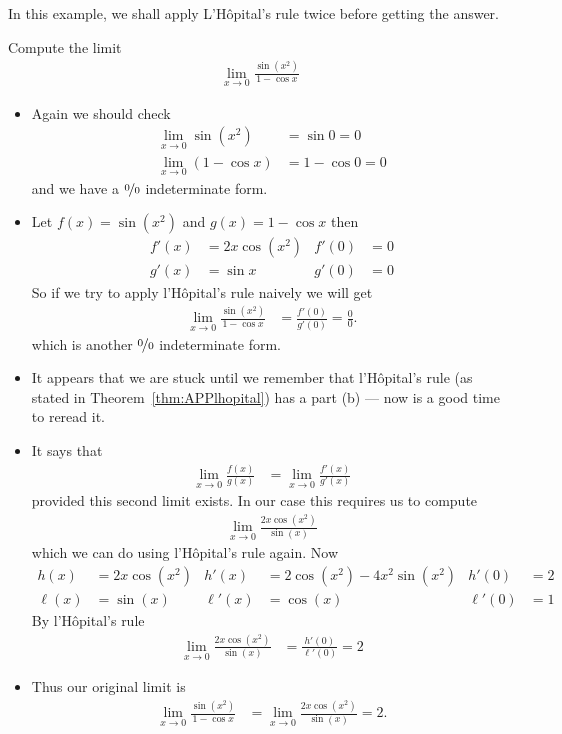 In this example, we shall apply L'H\^opital's rule twice before getting the answer.
\begin{eg}\label{eg:hopitalC}
Compute the limit
\begin{align*}
  \lim_{x\to 0} \frac{\sin(x^2)}{1-\cos x}
\end{align*}
\begin{itemize}
 \item Again we should check
\begin{align*}
  \lim_{x\to 0} \sin(x^2) &= \sin 0 = 0\\
  \lim_{x\to 0}(1-\cos x) &= 1-\cos 0 = 0
\end{align*}
and we have a $\nicefrac00$ indeterminate form.
\item Let $f(x) = \sin(x^2)$ and $g(x)=1-\cos x$ then
\begin{align*}
  f'(x) &= 2x\cos(x^2) & f'(0)&=0 \\
  g'(x) &= \sin x & g'(0) &=0
\end{align*}
So if we try to apply l'H\^opital's rule naively we will get
\begin{align*}
  \lim_{x\to 0} \frac{\sin(x^2)}{1-\cos x} &= \frac{f'(0)}{g'(0)} = \frac{0}{0}.
\end{align*}
which is another $\nicefrac00$ indeterminate form.
\item It appears that we are stuck until we remember that l'H\^opital's rule (as stated
in Theorem~\ref{thm:APPlhopital}) has a part (b) --- now is a good time to reread it.
\item It says that
\begin{align*}
  \lim_{x\to 0} \frac{f(x)}{g(x)} &= \lim_{x\to 0} \frac{f'(x)}{g'(x)}
\end{align*}
provided this second limit exists. In our case this requires us to compute
\begin{align*}
  \lim_{x \to 0} \frac{2x \cos(x^2)}{\sin(x)}
\end{align*}
which we can do using l'H\^opital's rule again. Now
\begin{align*}
  h(x) &= 2x\cos(x^2) & h'(x) &= 2\cos(x^2) - 4x^2\sin(x^2) & h'(0) &=2\\
  \ell(x) &= \sin(x) & \ell'(x) &= \cos(x) & \ell'(0) &= 1
\end{align*}
By l'H\^opital's rule
\begin{align*}
  \lim_{x \to 0} \frac{2x \cos(x^2)}{\sin(x)} &= \frac{h'(0)}{\ell'(0)} = 2
\end{align*}
\item Thus our original limit is
\begin{align*}
\lim_{x\to 0} \frac{\sin(x^2)}{1-\cos x}
&=\lim_{x \to 0} \frac{2x \cos(x^2)}{\sin(x)}
= 2.
\end{align*}


\end{itemize}
\end{eg}
